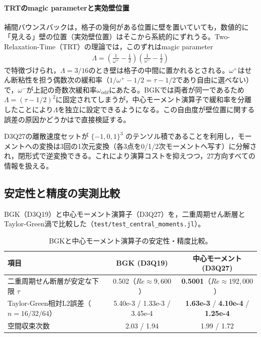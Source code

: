 \paragraph{TRTのmagic parameterと実効壁位置}
\label{sec:wall-position}
補間バウンスバックは，格子の幾何がある位置に壁を置いていても，数値的に「見える」壁の位置（実効壁位置）はそこから系統的にずれうる。Two-Relaxation-Time（TRT）の理論では，このずれはmagic parameter
\begin{align}
	\Lambda = \left(\frac{1}{\omega^+}-\frac{1}{2}\right)\left(\frac{1}{\omega^-}-\frac{1}{2}\right)
	\label{eq:magic-parameter}
\end{align}
で特徴づけられ，\(\Lambda=3/16\)のとき壁は格子の中間に置かれるとされる。\(\omega^+\)はせん断粘性を担う偶数次の緩和率（\(1/\omega^+-1/2=\tau-1/2\)であり自由に選べない）で，\(\omega^-\)が上記の奇数次緩和率\(\omega_{odd}\)にあたる。BGKでは両者が同一であるため\(\Lambda=(\tau-1/2)^2\)に固定されてしまうが，中心モーメント演算子で緩和率を分離したことにより\(\Lambda\)を独立に設定できるようになる。この自由度が壁位置に関する誤差の原因かどうかはで直接検証する。

D3Q27の離散速度セットが \(\{-1,0,1\}^3\) のテンソル積であることを利用し，モーメントへの変換は3回の1次元変換（各3点を0/1/2次モーメントへ写す）に分解され，閉形式で逆変換できる。これにより演算コストを抑えつつ，27方向すべての情報を扱える。

\subsection{安定性と精度の実測比較}

BGK（D3Q19）と中心モーメント演算子（D3Q27）を，二重周期せん断層とTaylor-Green渦で比較した（\texttt{test/test\_central\_moments.jl}）。

\begin{table}[H]
	\centering
	\caption{BGKと中心モーメント演算子の安定性・精度比較。}
	\label{tab:collision-comparison}
	\begin{tabular}{lcc}
		\Hline{1.5pt}
		項目 & BGK (D3Q19) & 中心モーメント (D3Q27) \\
		\hline
		二重周期せん断層が安定な下限 \(\tau\) & 0.502（\(Re\approx9{,}600\)） & \textbf{0.5001}（\(Re\approx192{,}000\)） \\
		Taylor-Green相対L2誤差（\(n=16/32/64\)） & 5.40e-3 / 1.33e-3 / 3.45e-4 & \textbf{1.63e-3} / \textbf{4.10e-4} / \textbf{1.25e-4} \\
		空間収束次数 & 2.03 / 1.94 & 1.99 / 1.72 \\
		\hline
	\end{tabular}
\end{table}

